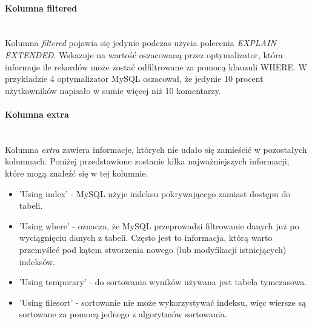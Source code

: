 \paragraph{Kolumna filtered}\leavevmode\\
Kolumna \textit{filtered} pojawia się jedynie podczas użycia polecenia \textit{EXPLAIN EXTENDED}. Wskazuje na wartość oszacowaną przez optymalizator, która informuje ile rekordów może zostać odfiltrowane za pomocą klauzuli WHERE. W przykładzie 4 optymalizator MySQL oszacował, że jedynie 10 procent użytkowników napisało w sumie więcej niż 10 komentarzy. 

\paragraph{Kolumna extra}\leavevmode\\
Kolumna \textit{extra} zawiera informacje, których nie udało się zamieścić w pozostałych kolumnach. Poniżej przedstawione zostanie kilka najważniejszych informacji, które mogą znaleźć się w tej kolumnie.

\begin{itemize}
	\item 'Using index' - MySQL użyje indeksu pokrywającego zamiast dostępu do tabeli.
	\item 'Using where' - oznacza, że MySQL przeprowadzi filtrowanie danych już po wyciągnięciu danych z tabeli. Często jest to informacja, którą warto przemyśleć pod kątem stworzenia nowego (lub modyfikacji istniejących) indeksów.
	\item 'Using temporary' - do sortowania wyników używana jest tabela tymczasowa.
	\item 'Using filesort' - sortowanie nie może wykorzystywać indeksu, więc wiersze są sortowane za pomocą jednego z algorytmów sortowania.
	
\end{itemize}